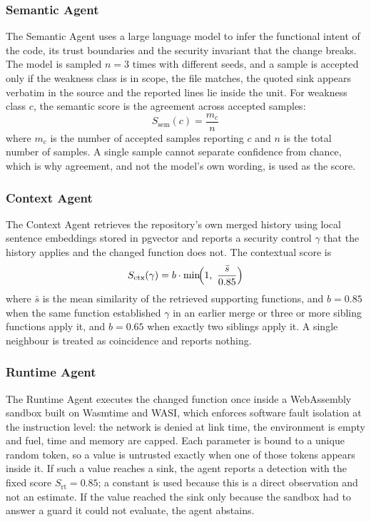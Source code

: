 \documentclass[conference]{IEEEtran}
\begin{document}
\subsubsection{Semantic Agent}
The Semantic Agent uses a large language model to infer the functional
intent of the code, its trust boundaries and the security invariant that
the change breaks. The model is sampled $n=3$ times with different seeds,
and a sample is accepted only if the weakness class is in scope, the file
matches, the quoted sink appears verbatim in the source and the reported
lines lie inside the unit. For weakness class $c$, the semantic score is
the agreement across accepted samples:
\begin{equation}
S_{\mathrm{sem}}(c)=\frac{m_c}{n}
\label{eq:sem}
\end{equation}
where $m_c$ is the number of accepted samples reporting $c$ and $n$ is the
total number of samples. A single sample cannot separate confidence from
chance, which is why agreement, and not the model's own wording, is used
as the score.

\subsubsection{Context Agent}
The Context Agent retrieves the repository's own merged history using local
sentence embeddings stored in pgvector and reports a security control
$\gamma$ that the history applies and the changed function does not. The
contextual score is
\begin{equation}
S_{\mathrm{ctx}}(\gamma)=b\cdot\min\!\Bigl(1,\ \frac{\bar{s}}{0.85}\Bigr)
\label{eq:ctx}
\end{equation}
where $\bar{s}$ is the mean similarity of the retrieved supporting
functions, and $b=0.85$ when the same function established $\gamma$ in an
earlier merge or three or more sibling functions apply it, and $b=0.65$
when exactly two siblings apply it. A single neighbour is treated as
coincidence and reports nothing.

\subsubsection{Runtime Agent}
The Runtime Agent executes the changed function once inside a WebAssembly
sandbox built on Wasmtime and WASI, which enforces software fault isolation
at the instruction level: the network is denied at link time, the
environment is empty and fuel, time and memory are capped. Each parameter
is bound to a unique random token, so a value is untrusted exactly when one
of those tokens appears inside it. If such a value reaches a sink, the
agent reports a detection with the fixed score
$S_{\mathrm{rt}}=0.85$; a constant is used because this is a direct
observation and not an estimate. If the value reached the sink only because
the sandbox had to answer a guard it could not evaluate, the agent abstains.
\end{document}
